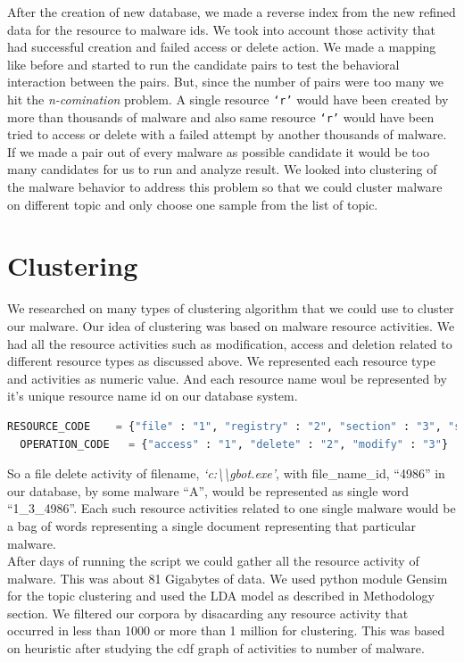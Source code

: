 After the creation of new database, we made a reverse index from the new refined data for the resource to malware ids.
We took into account those activity that had successful creation and failed access or delete action. We made a mapping like before and started to run the candidate pairs to test the behavioral interaction between the pairs. But, since the number of pairs were too many we hit the \emph{n-comination} problem.
A single resource \texttt{`r'} would have been created by more than thousands of malware and also same resource \texttt{`r'} would have been tried to access or delete with a failed attempt by another thousands of malware. If we made a pair out of every malware as possible candidate it would be too many candidates for us to run and analyze result.
We looked into clustering of the malware behavior to address this problem so that we could cluster malware on different topic and only choose one sample from the list of topic.
\section{Clustering}
\label{sec:Clustering}
We researched on many types of clustering algorithm that we could use to cluster our malware. Our idea of clustering was based on malware resource activities.
We had all the resource activities such as modification, access and deletion related to different resource types as discussed above.
We represented each resource type and activities as numeric value. And each resource name woul be represented by it's unique resource name id on our database system.
\begin{lstlisting}[language=python,caption={Numeric codes given to resource and operation},label={lbl:numericode}]
  RESOURCE_CODE    = {"file" : "1", "registry" : "2", "section" : "3", "service" : "4", "driver" : "5", "sync" : "6", "process" : "7", "job" : "8"}
  OPERATION_CODE   = {"access" : "1", "delete" : "2", "modify" : "3"}
\end{lstlisting}
So a file delete activity of filename, \textit{`c:\textbackslash\textbackslash{}gbot.exe'}, with file\_name\_id, ``4986'' in our database, by some malware ``A'', would be represented as single word ``1\_3\_4986''. Each such resource activities related to one single malware would be a bag of words representing  a single document representing that particular malware.\\
After days of running the script we could gather all the resource activity of {\gettotalmalwareii} malware. This was about 81 Gigabytes of data.
We used python module Gensim~\cite[Gensim]{gensim}  for the topic clustering and used the LDA model as described in Methodology section. We filtered our corpora by disacarding any resource activity that occurred in less than 1000 or more than 1 million for clustering.
This was based on heuristic after studying the cdf graph of activities to number of malware.

